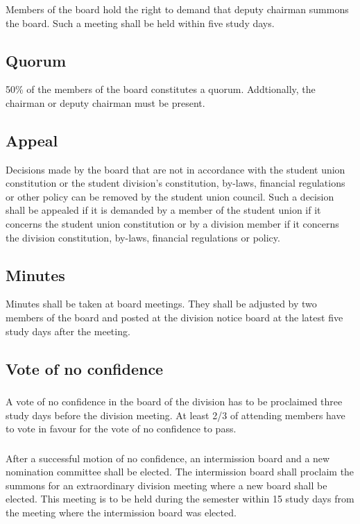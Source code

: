 \documentclass[a4paper]{dtek}
\begin{document}
\subsubsection{}
Members of the board hold the right to demand that deputy chairman summons the board. Such a meeting shall be held within five study days. 

\subsection{Quorum}
50\% of the members of the board constitutes a quorum. Addtionally, the chairman or deputy chairman must be present. 

\subsection{Appeal}
Decisions made by the board that are not in accordance with the student union constitution or the student division's constitution, by-laws, financial regulations or other policy can be removed by the student union council. Such a decision shall be appealed if it is demanded by a member of the student union if it concerns the student union constitution or by a division member if it concerns the division constitution, by-laws, financial regulations or policy. 

\subsection{Minutes}
Minutes shall be taken at board meetings. They shall be adjusted by two members of the board and posted at the division notice board at the latest five study days after the meeting. 


\subsection{Vote of no confidence}
\subsubsection{}
A vote of no confidence in the board of the division has to be proclaimed three study days before the division meeting. At least 2/3 of attending members have to vote in favour for the vote of no confidence to pass.

\subsubsection{}
After a successful motion of no confidence, an intermission board and a new nomination committee shall be elected. The intermission board shall proclaim the summons for an extraordinary division meeting where a new board shall be elected. This meeting is to be held during the semester within 15 study days from the meeting where the intermission board was elected.
\end{document}
